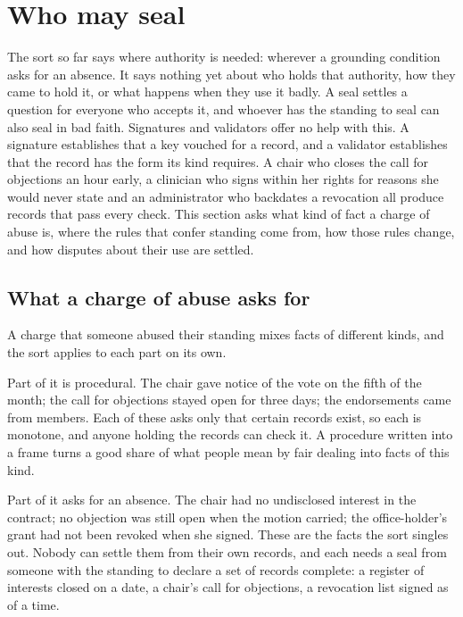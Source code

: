 \section{Who may seal}\label{sec:anchoring}

The sort so far says where authority is needed: wherever a grounding condition asks for an
absence. It says nothing yet about who holds that authority, how they came to hold it, or what
happens when they use it badly. A seal settles a question for everyone who accepts it, and whoever
has the standing to seal can also seal in bad faith. Signatures and validators offer no help with
this. A signature establishes that a key vouched for a record, and a validator establishes that the
record has the form its kind requires. A chair who closes the call for objections an hour early, a
clinician who signs within her rights for reasons she would never state and an administrator who
backdates a revocation all produce records that pass every check. This section asks what kind of
fact a charge of abuse is, where the rules that confer standing come from, how those rules change,
and how disputes about their use are settled.

\subsection{What a charge of abuse asks for}\label{sec:charge}

A charge that someone abused their standing mixes facts of different kinds, and the sort applies to
each part on its own.

Part of it is procedural. The chair gave notice of the vote on the fifth of the month; the call for
objections stayed open for three days; the endorsements came from members. Each of these asks only
that certain records exist, so each is monotone, and anyone holding the records can check it. A
procedure written into a frame turns a good share of what people mean by fair dealing into facts of
this kind.

Part of it asks for an absence. The chair had no undisclosed interest in the contract; no objection
was still open when the motion carried; the office-holder's grant had not been revoked when she
signed. These are the facts the sort singles out. Nobody can settle them from their own records, and
each needs a seal from someone with the standing to declare a set of records complete: a register of
interests closed on a date, a chair's call for objections, a revocation list signed as of a time.

